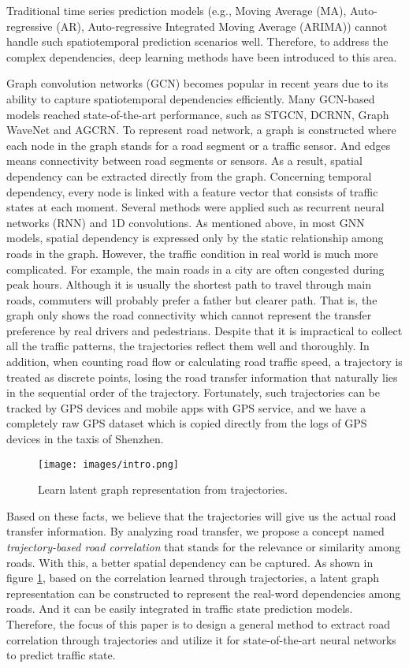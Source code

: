 Traditional time series prediction models (e.g., Moving Average (MA), Auto-regressive (AR), Auto-regressive Integrated Moving Average (ARIMA)) cannot handle such spatiotemporal prediction scenarios well. Therefore, to address the complex dependencies, deep learning methods have been introduced to this area.

Graph convolution networks (GCN)\cite{GCN0} becomes popular in recent years due to its ability to capture spatiotemporal dependencies efficiently. Many GCN-based models reached state-of-the-art performance, such as STGCN\cite{STGCN}, DCRNN\cite{DCRNN}, Graph WaveNet\cite{GWNET} and AGCRN\cite{AGCRN}. To represent road network, a graph is constructed where each node in the graph stands for a road segment or a traffic sensor. And edges means connectivity between road segments or sensors. As a result, spatial dependency can be extracted directly from the graph. Concerning temporal dependency, every node is linked with a feature vector that consists of traffic states at each moment. Several methods were applied such as recurrent neural networks (RNN) and 1D convolutions. As mentioned above, in most GNN models, spatial dependency is expressed only by the static relationship among roads in the graph. However, the traffic condition in real world is much more complicated. For example, the main roads in a city are often congested during peak hours. Although it is usually the shortest path to travel through main roads, commuters will probably prefer a father but clearer path. That is, the graph only shows the road connectivity which cannot represent the transfer preference by real drivers and pedestrians. Despite that it is impractical to collect all the traffic patterns, the trajectories reflect them well and thoroughly. In addition, when counting road flow or calculating road traffic speed, a trajectory is treated as discrete points, losing the road transfer information that naturally lies in the sequential order of the trajectory. Fortunately, such trajectories can be tracked by GPS devices and mobile apps with GPS service, and we have a completely raw GPS dataset which is copied directly from the logs of GPS devices in the taxis of Shenzhen.

\begin{figure}[htb]
    \centering
    \texttt{[image: images/intro.png]}
    \caption{Learn latent graph representation from trajectories.}
    \label{fig: intro}
  \end{figure}

Based on these facts, we believe that the trajectories will give us the actual road transfer information. By analyzing road transfer, we propose a concept named \textit{trajectory-based road correlation} that stands for the relevance or similarity among roads. With this, a better spatial dependency can be captured. As shown in figure \ref{fig: intro}, based on the correlation learned through trajectories, a latent graph representation can be constructed to represent the real-word dependencies among roads. And it can be easily integrated in traffic state prediction models. Therefore, the focus of this paper is to design a general method to extract road correlation through trajectories and utilize it for state-of-the-art neural networks to predict traffic state.

